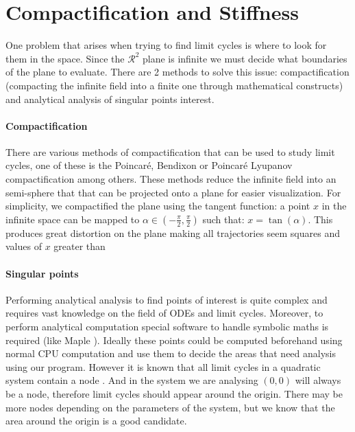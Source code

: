 
\section{Compactification and Stiffness}%
\label{sec:compact-stiff}

One problem that arises when trying to find limit cycles is where to look for
them in the space. Since the $\mathcal{R}^2$ plane is infinite we must decide
what boundaries of the plane to evaluate. There are 2 methods to solve this
issue: compactification (compacting the infinite field into a finite one through
mathematical constructs) and analytical analysis of singular points interest.

\paragraph{Compactification}
There are various methods of compactification that can be used to study
limit cycles, one of these is the Poincaré, Bendixon or
Poincaré Lyupanov compactification
\cite{poincare_sur_1891,bendixson_sur_1901,dumortier_poincare_2006,noauthor_fig_nodate}
among others.  These methods reduce the infinite field into an semi-sphere that
that can be projected onto a plane for easier visualization. For simplicity, we
compactified the plane using the tangent function: a point $x$ in the infinite
space can be mapped to $\alpha \in \left(-\frac{\pi}{2}, \frac{\pi}{2}\right)$
such that: $x = \tan(\alpha)$. This produces great distortion on the plane
making all trajectories seem squares and values of $x$ greater than

\paragraph{Singular points}
Performing analytical analysis to find points of interest is quite complex and
requires vast knowledge on the field of ODEs and limit cycles. Moreover, to
perform analytical computation special software to handle symbolic maths is
required (like Maple \cite{noauthor_maple_nodate}). Ideally these points could
be computed beforehand using normal CPU computation and use them to decide the
areas that need analysis using our program. However it is known that all limit
cycles in a quadratic system contain a node \cite{cherkas_quadratic_2003}. And
in the system we are analysing $(0,0)$ will always be a node, therefore limit
cycles should appear around the origin. There may be more nodes
depending on the parameters of the system, but we know that the area around the
origin is a good candidate.

